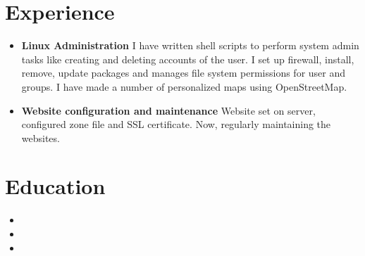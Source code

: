 \documentclass[10.1pt,a4paper,sans]{moderncv}        %
\begin{document}
\section{Experience}

\vspace{3pt}

\begin{itemize}


\item \textbf{Linux Administration}\newline
I have written shell scripts to perform system admin tasks like creating and deleting accounts of the user.
I set up firewall, install, remove, update packages and manages file system permissions for user and groups.
I have made a number of personalized maps using OpenStreetMap.

\vspace{3pt}

\item \textbf{Website configuration and maintenance}\newline
Website set on server, configured zone file and SSL certificate. Now, regularly maintaining the websites.

\end{itemize}

\section{Education}

\vspace{3pt}

\begin{itemize}

\item{}

\item{}  %

\item{}

\end{itemize}
\end{document}
